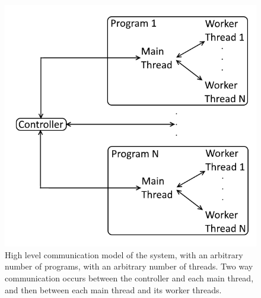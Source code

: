 \begin{figure}
	\centering
	\includegraphics[width=\textwidth]{graphics/communication_structure.png}
	\caption{High level communication model of the system, with an arbitrary number of programs, with an arbitrary number of threads. Two way communication occurs between the controller and each main thread, and then between each main thread and its worker threads.}
	\label{fig:communication_structure}
\end{figure}

